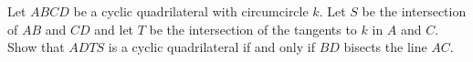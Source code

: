 Let $ABCD$ be a cyclic quadrilateral with circumcircle $k$. Let $S$ be the intersection
of $AB$ and $CD$ and let $T$ be the intersection of the tangents to $k$ in $A$ and $C$.
Show that $ADTS$ is a cyclic quadrilateral if and only if $BD$ bisects the line $AC$.
